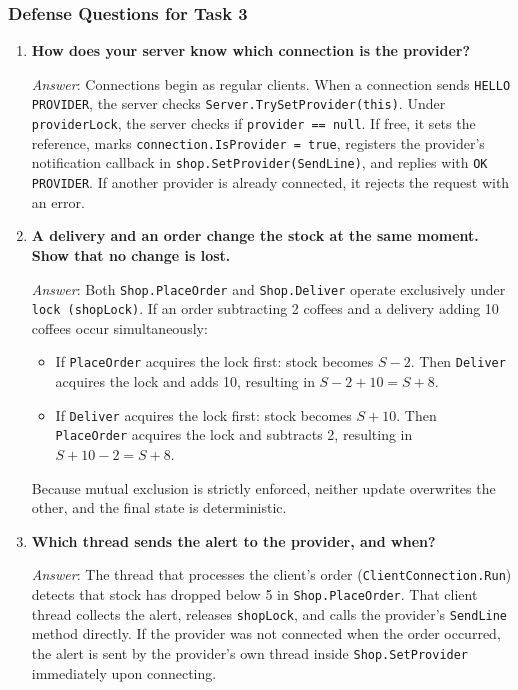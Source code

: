 \documentclass[11pt,a4paper]{article}
\begin{document}
\subsubsection{Defense Questions for Task 3}
\begin{enumerate}[label=\textbf{Q\arabic*.},leftmargin=*]
    \item \textbf{How does your server know which connection is the provider?}
    
    \textit{Answer}: Connections begin as regular clients. When a connection sends \texttt{HELLO PROVIDER}, the server checks \texttt{Server.TrySetProvider(this)}. Under \texttt{providerLock}, the server checks if \texttt{provider == null}. If free, it sets the reference, marks \texttt{connection.IsProvider = true}, registers the provider's notification callback in \texttt{shop.SetProvider(SendLine)}, and replies with \texttt{OK PROVIDER}. If another provider is already connected, it rejects the request with an error.

    \item \textbf{A delivery and an order change the stock at the same moment. Show that no change is lost.}
    
    \textit{Answer}: Both \texttt{Shop.PlaceOrder} and \texttt{Shop.Deliver} operate exclusively under \texttt{lock (shopLock)}. If an order subtracting 2 coffees and a delivery adding 10 coffees occur simultaneously:
    \begin{itemize}
        \item If \texttt{PlaceOrder} acquires the lock first: stock becomes $S - 2$. Then \texttt{Deliver} acquires the lock and adds 10, resulting in $S - 2 + 10 = S + 8$.
        \item If \texttt{Deliver} acquires the lock first: stock becomes $S + 10$. Then \texttt{PlaceOrder} acquires the lock and subtracts 2, resulting in $S + 10 - 2 = S + 8$.
    \end{itemize}
    Because mutual exclusion is strictly enforced, neither update overwrites the other, and the final state is deterministic.

    \item \textbf{Which thread sends the alert to the provider, and when?}
    
    \textit{Answer}: The thread that processes the client's order (\texttt{ClientConnection.Run}) detects that stock has dropped below 5 in \texttt{Shop.PlaceOrder}. That client thread collects the alert, releases \texttt{shopLock}, and calls the provider's \texttt{SendLine} method directly. If the provider was not connected when the order occurred, the alert is sent by the provider's own thread inside \texttt{Shop.SetProvider} immediately upon connecting.
\end{enumerate}
\end{document}
